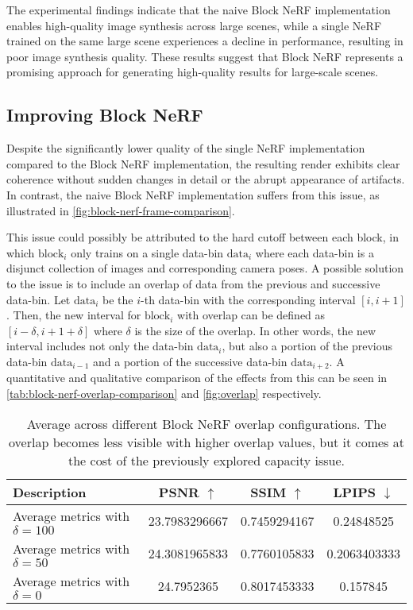 The experimental findings indicate that the naive Block NeRF implementation enables high-quality image synthesis across large scenes, while a single NeRF trained on the same large scene experiences a decline in performance, resulting in poor image synthesis quality. These results suggest that Block NeRF represents a promising approach for generating high-quality results for large-scale scenes.

\subsection{Improving Block NeRF}
Despite the significantly lower quality of the single NeRF implementation compared to the Block NeRF implementation, the resulting render exhibits clear coherence without sudden changes in detail or the abrupt appearance of artifacts. In contrast, the naive Block NeRF implementation suffers from this issue, as illustrated in \autoref{fig:block-nerf-frame-comparison}.



This issue could possibly be attributed to the hard cutoff between each block, in which $\text{block}_i$ only trains on a single data-bin $\text{data}_i$ where each data-bin is a disjunct collection of images and corresponding camera poses. A possible solution to the issue is to include an overlap of data from the previous and successive data-bin. Let $\text{data}_i$ be the $i$-th data-bin with the corresponding interval $[i, {i+1}]$. Then, the new interval for $\text{block}_i$ with overlap can be defined as $[i - \delta, {i+1} + \delta]$ where $\delta$ is the size of the overlap. In other words, the new interval includes not only the data-bin $\text{data}_i$, but also a portion of the previous data-bin $\text{data}_{i-1}$ and a portion of the successive data-bin $\text{data}_{i+2}$. A quantitative and qualitative comparison of the effects from this can be seen in \autoref{tab:block-nerf-overlap-comparison} and \autoref{fig:overlap} respectively.

\begin{table}[ht]
\centering
\setlength{\tabcolsep}{6pt}
\renewcommand{\arraystretch}{1.5}
\begin{tabular}{l | C{2.2} C{1.3} C{1.3}}
\hline
\textbf{Description} & \textbf{PSNR $\uparrow$} & \textbf{SSIM $\uparrow$} & \textbf{LPIPS $\downarrow$} \\
\hline
Average metrics with $\delta = 100$ &23.7983296667 &0.7459294167 &0.24848525 \\
Average metrics with $\delta = 50$  & 24.3081965833 & 0.7760105833 & 0.2063403333 \\
Average metrics with $\delta = 0$ &24.7952365 &0.8017453333 &0.157845 \\
\hline
\end{tabular}
\caption{Average across different Block NeRF overlap configurations. The overlap becomes less visible with higher overlap values, but it comes at the cost of the previously explored capacity issue.}
\label{tab:block-nerf-overlap-comparison}
\end{table}

